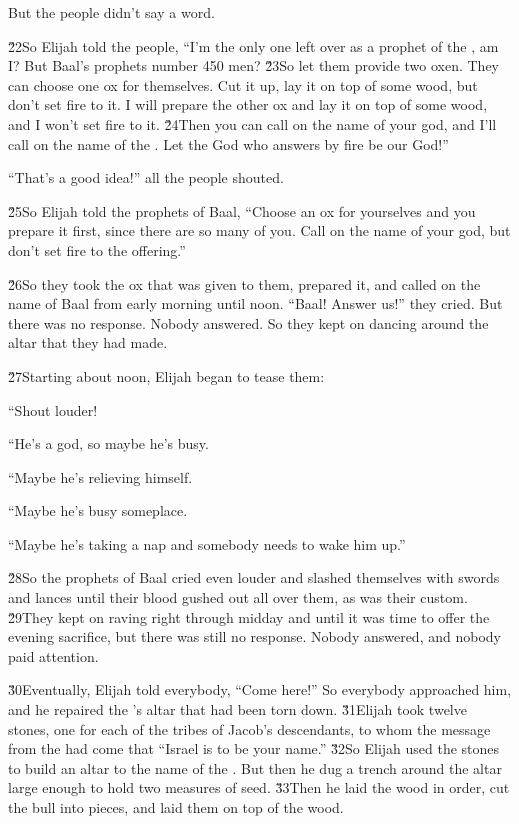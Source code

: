 But the people didn't say a word.

\v{22}So Elijah told the people, ``I'm the only one left over as a prophet of the , am I? But Baal's prophets number 450 men? \v{23}So let them provide two oxen. They can choose one ox for themselves. Cut it up, lay it on top of some wood, but don't set fire to it. I will prepare the other ox and lay it on top of some wood, and I won't set fire to it. \v{24}Then you can call on the name of your god, and I'll call on the name of the . Let the God who answers by fire be our God!''

``That's a good idea!'' all the people shouted.

\v{25}So Elijah told the prophets of Baal, ``Choose an ox for yourselves and you prepare it first, since there are so many of you. Call on the name of your god, but don't set fire to the offering.''

\v{26}So they took the ox that was given to them, prepared it, and called on the name of Baal from early morning until noon. ``Baal! Answer us!'' they cried. But there was no response. Nobody answered. So they kept on dancing around the altar that they had made.

\v{27}Starting about noon, Elijah began to tease them:

``Shout louder!

``He's a god, so maybe he's busy.

``Maybe he's relieving himself.

``Maybe he's busy someplace.

``Maybe he's taking a nap and somebody needs to wake him up.''

\v{28}So the prophets of Baal cried even louder and slashed themselves with swords and lances until their blood gushed out all over them, as was their custom. \v{29}They kept on raving right through midday and until it was time to offer the evening sacrifice, but there was still no response. Nobody answered, and nobody paid attention.

\v{30}Eventually, Elijah told everybody, ``Come here!'' So everybody approached him, and he repaired the 's altar that had been torn down. \v{31}Elijah took twelve stones, one for each of the tribes of Jacob's descendants, to whom the message from the  had come that ``Israel is to be your name.'' \v{32}So Elijah used the stones to build an altar to the name of the . But then he dug a trench around the altar large enough to hold two measures of seed. \v{33}Then he laid the wood in order, cut the bull into pieces, and laid them on top of the wood.

